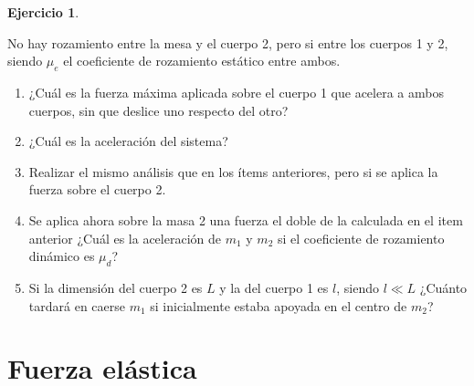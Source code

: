 \documentclass[a4paper,12pt,twoside]{book}
\newtheorem{ejercicio}{{Ejercicio}}[chapter]
\begin{document}
\begin{mdframed}[style=ejercicio-dificil]
    \begin{ejercicio}
    \end{ejercicio}
    No hay rozamiento entre la mesa y el cuerpo 2, pero si entre los cuerpos 1 y 2, siendo $\mu_e$ el coeficiente de rozamiento estático entre ambos.
    \begin{center}
        \def\svgwidth{0.8\linewidth}
        
    \end{center}
    \begin{enumerate}
        \item ¿Cuál es la fuerza máxima aplicada sobre el cuerpo 1 que acelera a ambos cuerpos, sin que deslice uno respecto del otro?
        \item ¿Cuál es la aceleración del sistema?
        \item Realizar el mismo análisis que en los ítems anteriores, pero si se aplica la fuerza sobre el cuerpo 2.
        \item Se aplica ahora sobre la masa 2 una fuerza el doble de la calculada en el item anterior ¿Cuál es la aceleración de $m_1$ y $m_2$ si el coeficiente de rozamiento dinámico es $\mu_d$?
        \item Si la dimensión del cuerpo 2 es $L$ y la del cuerpo 1 es $l$, siendo $l \ll L$ ¿Cuánto tardará en caerse $m_1$ si inicialmente estaba apoyada en el centro de $m_2$?
    \end{enumerate}
\end{mdframed}


\section{Fuerza elástica}
\end{document}
